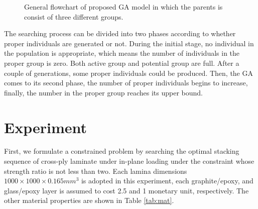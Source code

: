 \documentclass[10pt, journal]{IEEEtran}
\begin{document}
\begin{figure}[!b]
	\caption{General flowchart of proposed GA model in which the parents is consist of three different groups.}
	\label{fig:model}
\end{figure}

The searching process can be divided into two phases according to whether
proper individuals are generated or not. During the initial stage, no individual in
the population is appropriate, which means the number of individuals in the
proper group is zero. Both active group and potential group are full. After a
couple of generations, some proper individuals could be produced. Then, the GA
comes to its second phase, the number of proper individuals begins to increase,
finally, the number in the proper group reaches its upper bound. 


\section{Experiment}
First, we formulate a constrained problem by searching the optimal stacking
sequence of cross-ply laminate under in-plane loading under the constraint
whose strength ratio is not less than two.  Each lamina dimensions $1000 \times
1000 \times 0.165 mm^3$ is adopted in this experiment, each graphite/epoxy,
and glass/epoxy layer is assumed to cost 2.5 and 1 monetary unit,
respectively. The other material properties are shown in Table \ref{tab:mat}. 
\end{document}
